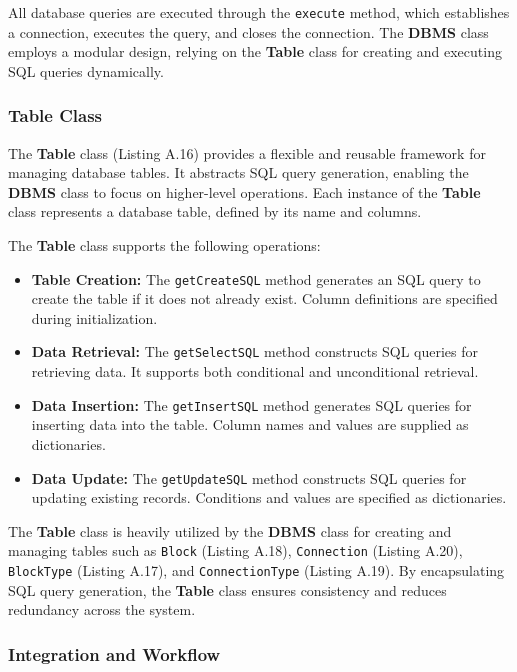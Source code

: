 All database queries are executed through the \texttt{execute} method, which establishes a connection, executes the query, and closes the connection. The \textbf{DBMS} class employs a modular design, relying on the \textbf{Table} class for creating and executing SQL queries dynamically.

\subsubsection{Table Class}

The \textbf{Table} class (Listing A.16) provides a flexible and reusable framework for managing database tables. It abstracts SQL query generation, enabling the \textbf{DBMS} class to focus on higher-level operations. Each instance of the \textbf{Table} class represents a database table, defined by its name and columns.

The \textbf{Table} class supports the following operations:
\begin{itemize}
    \item \textbf{Table Creation:} The \texttt{getCreateSQL} method generates an SQL query to create the table if it does not already exist. Column definitions are specified during initialization.
    \item \textbf{Data Retrieval:} The \texttt{getSelectSQL} method constructs SQL queries for retrieving data. It supports both conditional and unconditional retrieval.
    \item \textbf{Data Insertion:} The \texttt{getInsertSQL} method generates SQL queries for inserting data into the table. Column names and values are supplied as dictionaries.
    \item \textbf{Data Update:} The \texttt{getUpdateSQL} method constructs SQL queries for updating existing records. Conditions and values are specified as dictionaries.
\end{itemize}

The \textbf{Table} class is heavily utilized by the \textbf{DBMS} class for creating and managing tables such as \texttt{Block} (Listing A.18), \texttt{Connection} (Listing A.20), \texttt{BlockType} (Listing A.17), and \texttt{ConnectionType} (Listing A.19). By encapsulating SQL query generation, the \textbf{Table} class ensures consistency and reduces redundancy across the system.

\subsubsection{Integration and Workflow}

